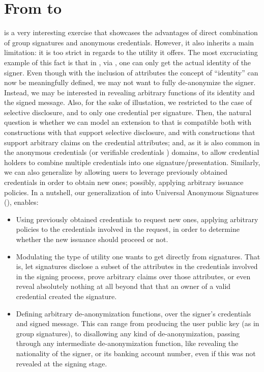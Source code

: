 \section{From \GSAC to \UAS}
\label{sec:uas}

\GSAC is a very interesting exercise that showcases the advantages of direct
combination of group signatures and anonymous credentials. However, it also
inherits a main limitation: it is too strict in regards to the utility it
offers. The most excruciating example of this fact is that in \GSAC, via \Open,
one can only get the actual identity of the signer. Even though with the inclusion
of attributes the concept of ``identity'' can now be meaningfully defined, we
may not want to fully de-anonymize the signer. Instead, we may be interested in
revealing arbitrary functions of its identity and the signed message. Also, for
the sake of illustation, we restricted to the case of selective disclosure, and
to only one credential per signature. Then, the natural question is whether we
can model an extension to \GSAC that is compatible both with constructions with
that support selective disclosure, and with constructions that support arbitrary
claims on the
credential attributes; and, as it is also common in the anonymous credentials
(or verifiable credentials \needcite) domains, to allow credential holders to
combine multiple credentials into one signature/presentation. Similarly, we can
also generalize \GSAC by allowing users to leverage previously obtained
credentials in order to obtain new ones; possibly, applying arbitrary issuance
policies. In a nutshell, our generalization of \GSAC into Universal Anonymous
Signatures (\UAS), enables:

\begin{itemize}
\item Using previously obtained credentials to request new ones, applying
  arbitrary policies to the credentials involved in the request, in
  order to determine whether the new issuance should proceed or not.
\item Modulating the type of utility one wants to get directly from signatures.
  That is, let signatures disclose a subset of the attributes in the credentials
  involved in the signing process, prove arbitrary claims over those attributes,
  or even reveal absolutely nothing at all beyond that that an owner of a valid
  credential created the signature.
\item Defining arbitrary de-anonymization functions, over the signer's
  credentials and signed message. This can range from producing the user public
  key (as in group signatures), to disallowing any kind of de-anonymization,
  passing through any intermediate de-anonymization function, like revealing
  the nationality of the signer, or its banking account number, even if this
  was not revealed at the signing stage.
\end{itemize}

